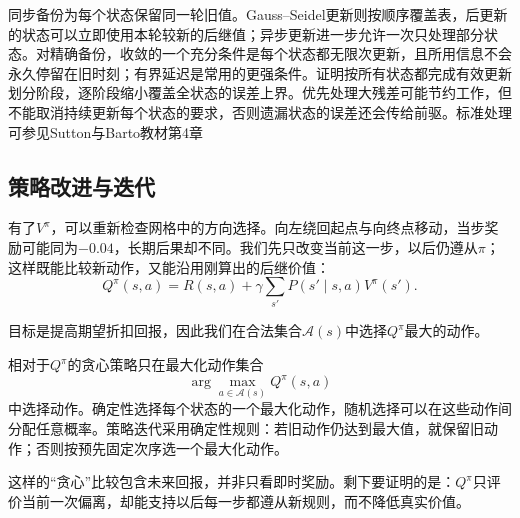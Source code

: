 同步备份为每个状态保留同一轮旧值。Gauss--Seidel更新则按顺序覆盖表，后更新的状态可以立即使用本轮较新的后继值；异步更新进一步允许一次只处理部分状态。对精确备份，收敛的一个充分条件是每个状态都无限次更新，且所用信息不会永久停留在旧时刻；有界延迟是常用的更强条件。证明按所有状态都完成有效更新划分阶段，逐阶段缩小覆盖全状态的误差上界。优先处理大残差可能节约工作，但不能取消持续更新每个状态的要求，否则遗漏状态的误差还会传给前驱。标准处理可参见Sutton与Barto教材第4章

\subsection{策略改进与迭代}
\label{sec:rl-planning-policy-iteration}

有了$V^\pi$，可以重新检查网格中的方向选择。向左绕回起点与向终点移动，当步奖励可能同为$-0.04$，长期后果却不同。我们先只改变当前这一步，以后仍遵从$\pi$；这样既能比较新动作，又能沿用刚算出的后继价值：
\[
 Q^\pi(s,a)=R(s,a)+\gamma\sum_{s'}P(s'\mid s,a)V^\pi(s').
\]

目标是提高期望折扣回报，因此我们在合法集合$\mathcal A(s)$中选择$Q^\pi$最大的动作。

\begin{definition}[贪心策略]
 \label{def:rl-planning-greedy}
 相对于$Q^\pi$的贪心策略只在最大化动作集合
 \[
  \arg\max_{a\in\mathcal A(s)}Q^\pi(s,a)
 \]
 中选择动作。确定性选择每个状态的一个最大化动作，随机选择可以在这些动作间分配任意概率。策略迭代采用确定性规则：若旧动作仍达到最大值，就保留旧动作；否则按预先固定次序选一个最大化动作。
\end{definition}

这样的“贪心”比较包含未来回报，并非只看即时奖励。剩下要证明的是：$Q^\pi$只评价当前一次偏离，却能支持以后每一步都遵从新规则，而不降低真实价值。

